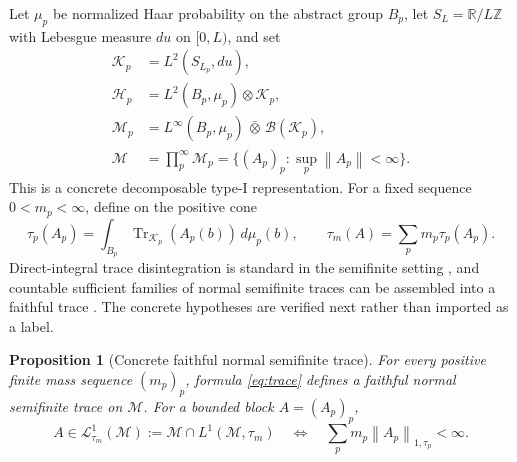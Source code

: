\documentclass[11pt,a4paper]{article}
\newtheorem{proposition}[theorem]{Proposition}
\theoremstyle{definition}
\newcommand{\R}{\mathbb R}
\newcommand{\Z}{\mathbb Z}
\newcommand{\M}{\mathcal M}
\newcommand{\Hc}{\mathcal H}
\newcommand{\Lc}{\mathcal L}
\newcommand{\Tr}{\operatorname{Tr}}
\newcommand{\norm}[1]{\left\lVert #1\right\rVert}
\begin{document}
Let $\mu_p$ be normalized Haar probability on the abstract group $B_p$, let
$S_{L}=\R/L\Z$ with Lebesgue measure $du$ on $[0,L)$, and set
\begin{equation}
 \begin{aligned}
  \mathcal K_p&=L^2(S_{L_p},du),\\
  \Hc_p&=L^2(B_p,\mu_p)\otimes \mathcal K_p,\\
  \M_p&=L^\infty(B_p,\mu_p)\,\bar\otimes\,\mathcal B(\mathcal K_p),\\
  \M&=\prod_p^{\infty}\M_p
     =\{(A_p)_p:\sup_p\norm{A_p}<\infty\}.
 \end{aligned}
 \label{eq:algebra}
\end{equation}
This is a concrete decomposable type-I representation.  For a fixed sequence
$0<m_p<\infty$, define on the positive cone
\begin{equation}
 \tau_p(A_p)=\int_{B_p}\Tr_{\mathcal K_p}(A_p(b))\,d\mu_p(b),
 \qquad
 \tau_m(A)=\sum_p m_p\tau_p(A_p).
 \label{eq:trace}
\end{equation}
Direct-integral trace disintegration is standard in the semifinite setting
\citep[p.~118 and Lemma 2.1]{Hiai1988}, and countable sufficient families of
normal semifinite traces can be assembled into a faithful trace
\citep[Theorem 2.1]{BagarelloTrapaniTriolo2006}.  The concrete hypotheses are
verified next rather than imported as a label.

\begin{proposition}[Concrete faithful normal semifinite trace]
\label{prop:fns}
For every positive finite mass sequence $(m_p)_p$, formula
\eqref{eq:trace} defines a faithful normal semifinite trace on $\M$.
For a bounded block $A=(A_p)_p$,
\begin{equation}
 A\in \Lc^1_{\tau_m}(\M):=\M\cap L^1(\M,\tau_m)
 \quad\Longleftrightarrow\quad
 \sum_p m_p\norm{A_p}_{1,\tau_p}<\infty .
 \label{eq:blockL1}
\end{equation}
\end{proposition}
\end{document}
